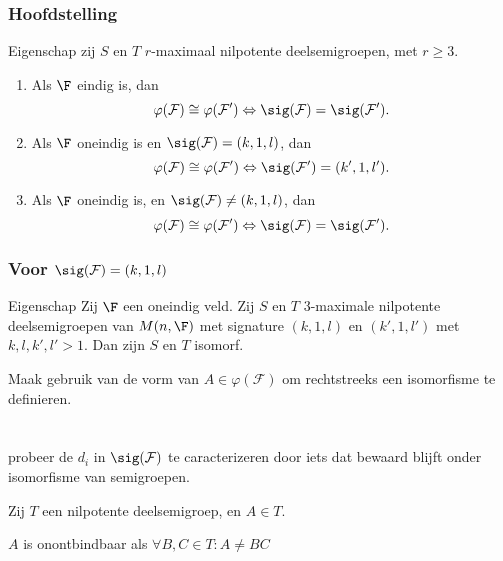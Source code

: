\begin{frame}
\frametitle{Hoofdstelling}
\begin{block}{Eigenschap}
zij $S$ en $T$ $r$-maximaal nilpotente deelsemigroepen, met $r\geq 3$.
\begin{enumerate}
\item Als $\F$ eindig is, dan 
$$\varphi(\mathcal{F}) \cong \varphi(\mathcal{F}') \Leftrightarrow \sig (\mathcal{F}) = \sig (\mathcal{F}').$$
\item Als $\F$ oneindig is en $\sig (\mathcal{F}) = (k,1,l)$, dan 
$$\varphi(\mathcal{F}) \cong \varphi(\mathcal{F}') \Leftrightarrow \sig(\mathcal{F}') = (k',1,l').$$
\item Als $\F$ oneindig is, en $\sig(\mathcal{F)} \neq (k,1,l)$, dan 
$$\varphi(\mathcal{F}) \cong \varphi(\mathcal{F}') \Leftrightarrow \sig(\mathcal{F}) = \sig(\mathcal{F}').$$
\end{enumerate}

\end{block}

\end{frame}


\begin{frame}
\frametitle{Voor $\sig(\mathcal{F}) = (k,1,l)$}

\begin{block}{Eigenschap}
Zij $\F$ een oneindig veld. Zij $S$ en $T$ $3$-maximale nilpotente deelsemigroepen van $M(n,\F)$ met signature $(k,1,l)$ en $(k',1,l')$ met $k,l,k',l' > 1$. Dan zijn $S$ en $T$ isomorf.
\end{block}

\begin{block}{}
Maak gebruik van de vorm van $A \in \varphi(\mathcal{F})$ om rechtstreeks een isomorfisme te definieren.
\end{block}

\end{frame}

\begin{frame}
\frametitle{ $ $ }

\begin{block}{}
probeer de $d_i$ in $\sig(\mathcal{F})$ te caracterizeren door iets dat bewaard blijft onder isomorfisme van semigroepen. 
\end{block}

\begin{block}{}
Zij $T$ een nilpotente deelsemigroep, en $A \in T$.

$A$ is onontbindbaar als $\forall B,C \in T: A \neq BC$
\end{block}

\end{frame}


